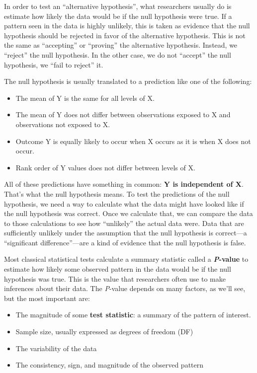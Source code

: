 \documentclass[
  13,
  letterpaper,
]{report}
\begin{document}
In order to test an ``alternative hypothesis'', what researchers usually
do is estimate how likely the data would be if the null hypothesis were
true. If a pattern seen in the data is highly unlikely, this is taken as
evidence that the null hypothesis should be rejected in favor of the
alternative hypothesis. This is not the same as ``accepting'' or
``proving'' the alternative hypothesis. Instead, we ``reject'' the null
hypothesis. In the other case, we do not ``accept'' the null hypothesis,
we ``fail to reject'' it.

The null hypothesis is usually translated to a prediction like one of
the following:

\begin{itemize}
\item
  The mean of Y is the same for all levels of X.
\item
  The mean of Y does not differ between observations exposed to X and
  observations not exposed to X.
\item
  Outcome Y is equally likely to occur when X occurs as it is when X
  does not occur.
\item
  Rank order of Y values does not differ between levels of X.
\end{itemize}

All of these predictions have something in common: \textbf{Y is
independent of X}. That's what the null hypothesis means. To test the
predictions of the null hypothesis, we need a way to calculate what the
data might have looked like if the null hypothesis was correct. Once we
calculate that, we can compare the data to those calculations to see how
``unlikely'' the actual data were. Data that are sufficiently unlikely
under the assumption that the null hypothesis is correct---a
``significant difference''---are a kind of evidence that the null
hypothesis is false.

Most classical statistical tests calculate a summary statistic called a
\textbf{\emph{P}-value} to estimate how likely some observed pattern in
the data would be if the null hypothesis was true. This is the value
that researchers often use to make inferences about their data. The
\emph{P}-value depends on many factors, as we'll see, but the most
important are:

\begin{itemize}
\item
  The magnitude of some \textbf{test statistic}: a summary of the
  pattern of interest.
\item
  Sample size, usually expressed as degrees of freedom (DF)
\item
  The variability of the data
\item
  The consistency, sign, and magnitude of the observed pattern
\end{itemize}
\end{document}
